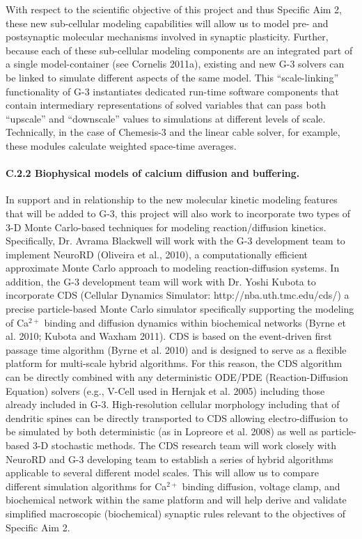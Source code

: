 \documentclass[12pt]{article}
\begin{document}
With respect to the
scientific objective of this project and thus Specific Aim 2, these
new sub-cellular modeling capabilities will allow us to model pre- and
postsynaptic molecular mechanisms involved in synaptic plasticity.
Further, because each of these sub-cellular modeling components are an
integrated part of a single model-container (see Cornelis 2011a),
existing and new G-3 solvers can be linked to simulate
different aspects of the same model. This ``scale-linking''
functionality of G-3 instantiates dedicated run-time software
components that contain intermediary representations of solved
variables that can pass both ``upscale'' and ``downscale'' values to
simulations at different levels of scale.  Technically, in the case of
Chemesis-3 and the linear cable solver, for example, these modules
calculate weighted space-time averages.

\paragraph{C.2.2 Biophysical models of calcium diffusion and buffering.} In support and in relationship to the new molecular kinetic modeling features that will be added to G-3, this project will also work to incorporate two types of 3-D Monte Carlo-based techniques for modeling reaction/diffusion kinetics. Specifically, Dr. Avrama Blackwell will work with the G-3 development team to implement NeuroRD (Oliveira et al., 2010), a computationally efficient approximate Monte Carlo approach to modeling reaction-diffusion systems. In addition, the G-3 development team will work with Dr. Yoshi Kubota to incorporate CDS (Cellular Dynamics Simulator: http://nba.uth.tmc.edu/cds/) a precise particle-based Monte Carlo simulator specifically supporting the modeling of Ca$^{2+}$ binding and diffusion dynamics within biochemical networks (Byrne et al. 2010; Kubota and Waxham 2011). CDS is based on the event-driven first passage time algorithm (Byrne et al. 2010) and is designed to serve as a flexible platform for multi-scale hybrid algorithms. For this reason, the CDS algorithm can be directly combined with any deterministic ODE/PDE (Reaction-Diffusion Equation) solvers (e.g., V-Cell used in Hernjak et al. 2005) including those already included in G-3. High-resolution cellular morphology including that of dendritic spines can be directly transported to CDS allowing electro-diffusion to be simulated by both deterministic (as in Lopreore et al. 2008) as well as particle-based 3-D stochastic methods. The CDS research team will work closely with NeuroRD and G-3 developing team to establish a series of hybrid algorithms applicable to several different model scales. This will allow us to compare different simulation algorithms for Ca$^{2+}$ binding diffusion, voltage clamp, and biochemical network within the same platform and will help derive and validate simplified macroscopic (biochemical) synaptic rules relevant to the objectives of Specific Aim 2.
\end{document}

